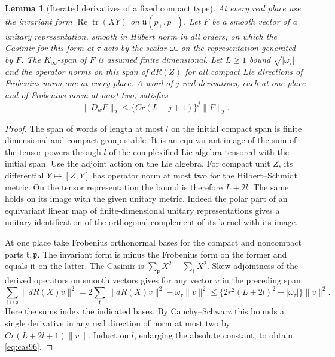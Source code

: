 \documentclass[a4paper,11pt]{article}
\newtheorem{lemma}[proposition]{Lemma}
\theoremstyle{definition}
\theoremstyle{remark}
\numberwithin{equation}{section}
\begin{document}
\begin{lemma}[Iterated derivatives of a fixed compact type]\label{lem:cas96}
At every real place use the invariant form
\(\operatorname{Re}\operatorname{tr}(XY)\) on \(\mathfrak u(p_+,p_-)\).
Let \(F\) be a smooth vector of a unitary representation, smooth
in Hilbert norm in all orders, on which the Casimir for this form
at \(\tau\) acts by the scalar \(\omega_\tau\) on the representation
generated by \(F\). The \(K_\infty\)-span of \(F\) is assumed
finite dimensional. Let \(L\ge1\) bound \(\sqrt{|\omega_\tau|}\)
and the operator norms on this span of \(dR(Z)\) for all compact
Lie directions of Frobenius norm one at every place. A word of
\(j\) real derivatives, each at one place and of Frobenius norm
at most two, satisfies
\begin{equation}
          \|D_wF\|_2\le \{C r(L+j+1)\}^j\|F\|_2 .          \label{eq:cas96}
\end{equation}
\end{lemma}
\begin{proof}
The span of words of length at most \(l\) on the initial compact
span is finite dimensional and compact-group stable. It is an
equivariant image of the sum of the tensor powers through \(l\)
of the complexified Lie algebra tensored with the initial span.
Use the adjoint action on the Lie algebra. For compact unit
\(Z\), its differential \(Y\mapsto[Z,Y]\) has operator norm at
most two for the Hilbert--Schmidt metric. On the tensor
representation the bound is therefore \(L+2l\). The same holds
on its image with the given unitary metric. Indeed the polar part
of an equivariant linear map of finite-dimensional unitary
representations gives a unitary identification of the orthogonal
complement of its kernel with its image.

At one place take Frobenius orthonormal bases for the compact
and noncompact parts \(\mathfrak k,\mathfrak p\). The invariant
form is minus the Frobenius form on the former and equals it on
the latter. The Casimir is \(\sum_{\mathfrak p}X^2-\sum_{\mathfrak k}X^2\).
Skew adjointness of the derived operators on smooth vectors gives
for any vector \(v\) in the preceding span
\[
 \sum_{\mathfrak k\cup\mathfrak p}\|dR(X)v\|^2
       =2\sum_{\mathfrak k}\|dR(X)v\|^2-\omega_\tau\|v\|^2
       \le \{2r^2(L+2l)^2+|\omega_\tau|\}\|v\|^2 .
\]
Here the sums index the indicated bases. By Cauchy--Schwarz this
bounds a single derivative in any real direction of norm at most
two by \(Cr(L+2l+1)\|v\|\). Induct on \(l\), enlarging the
absolute constant, to obtain \eqref{eq:cas96}.
\end{proof}
\end{document}
